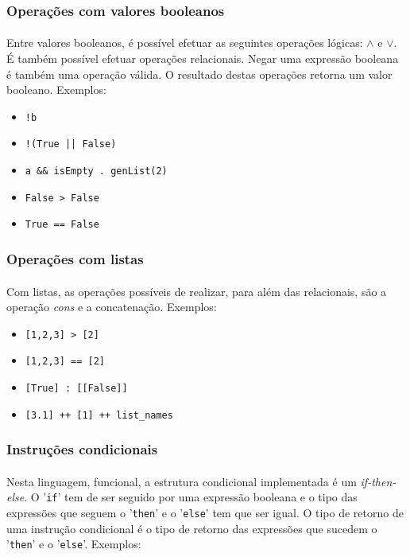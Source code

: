 \documentclass[11pt,a4paper]{report}
\begin{document}
\subsubsection{Operações com valores booleanos}
\paragraph*{}
Entre valores booleanos, é possível efetuar as seguintes operações lógicas: $\land$ e $\lor$. É também possível efetuar operações relacionais. Negar uma expressão booleana é também uma operação válida. O resultado destas operações retorna um valor booleano. Exemplos:

\begin{itemize}
    \item \texttt{!b}
    \item \texttt{!(True || False)}
    \item \texttt{a && isEmpty . genList(2)}
    \item \texttt{False > False}
    \item \texttt{True == False}
\end{itemize}

\subsubsection{Operações com listas}
\paragraph*{}
Com listas, as operações possíveis de realizar, para além das relacionais, são a operação \textit{cons} e a concatenação. Exemplos:

\begin{itemize}
    \item \texttt{[1,2,3] > [2]}
    \item \texttt{[1,2,3] == [2]}
    \item \texttt{[True] : [[False]]}
    \item \texttt{[3.1] ++ [1] ++ list_names}
\end{itemize}

\subsubsection{Instruções condicionais}
\paragraph*{}
Nesta linguagem, funcional, a estrutura condicional implementada é um \textit{if-then-else}. O '\texttt{if}' tem de ser seguido por uma expressão booleana e o tipo das expressões que seguem o '\texttt{then}' e o '\texttt{else}' tem que ser igual. O tipo de retorno de uma instrução condicional é o tipo de retorno das expressões que sucedem o '\texttt{then}' e o '\texttt{else}'. Exemplos: 
\end{document}
